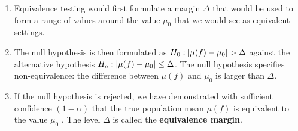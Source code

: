 \begin{enumerate}
    \item  Equivalence testing would first formulate a margin $\Delta$ that would be used to form a range of values around the value $\mu_0$ that we would see as equivalent settings. 
    \hfill \cite{statistics/book/Statistics-for-Data-Scientists/Maurits-Kaptein}

    \item  The null hypothesis is then formulated as $H_0 : \left| \mu( f ) - \mu_0 \right| > \Delta$ against the alternative hypothesis $H_a : \left| \mu( f ) - \mu_0 \right| \leq \Delta$. 
    The null hypothesis specifies non-equivalence: the difference between $\mu( f )$ and $\mu_0$ is larger than $\Delta$.
    \hfill \cite{statistics/book/Statistics-for-Data-Scientists/Maurits-Kaptein}

    \item  If the null hypothesis is rejected, we have demonstrated with sufficient confidence $(1 - \alpha)$ that the true population mean $\mu( f )$ is equivalent to the value $\mu_0$ . 
    The level $\Delta$ is called the \textbf{equivalence margin}.
    \hfill \cite{statistics/book/Statistics-for-Data-Scientists/Maurits-Kaptein}
\end{enumerate}

















